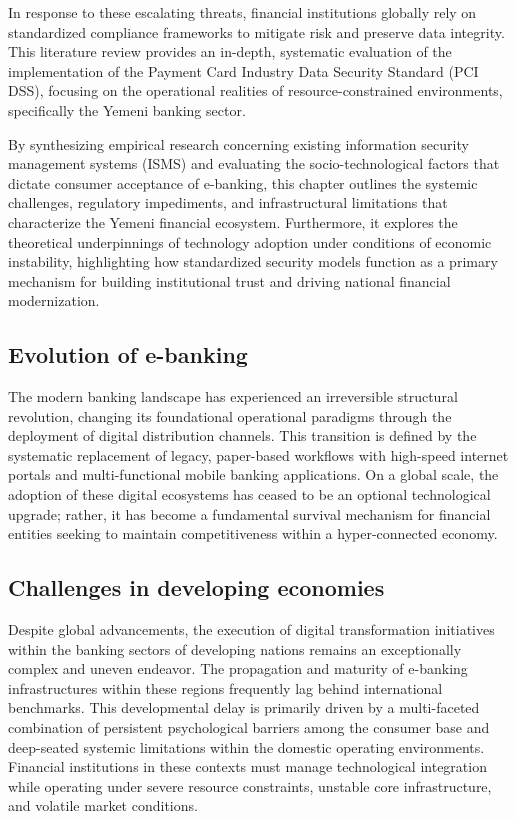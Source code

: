 \documentclass[12pt,a4paper,oneside]{report}
\begin{document}
	In response to these escalating threats, financial institutions globally rely on standardized compliance frameworks to mitigate risk and preserve data integrity. This literature review provides an in-depth, systematic evaluation of the implementation of the Payment Card Industry Data Security Standard (PCI DSS), focusing on the operational realities of resource-constrained environments, specifically the Yemeni banking sector. 
	
	By synthesizing empirical research concerning existing information security management systems (ISMS) and evaluating the socio-technological factors that dictate consumer acceptance of e-banking, this chapter outlines the systemic challenges, regulatory impediments, and infrastructural limitations that characterize the Yemeni financial ecosystem. Furthermore, it explores the theoretical underpinnings of technology adoption under conditions of economic instability, highlighting how standardized security models function as a primary mechanism for building institutional trust and driving national financial modernization.
	
	
	\subsection{Evolution of e-banking}
	The modern banking landscape has experienced an irreversible structural revolution, changing its foundational operational paradigms through the deployment of digital distribution channels. This transition is defined by the systematic replacement of legacy, paper-based workflows with high-speed internet portals and multi-functional mobile banking applications. On a global scale, the adoption of these digital ecosystems has ceased to be an optional technological upgrade; rather, it has become a fundamental survival mechanism for financial entities seeking to maintain competitiveness within a hyper-connected economy.
	
	\subsection{Challenges in developing economies}
	Despite global advancements, the execution of digital transformation initiatives within the banking sectors of developing nations remains an exceptionally complex and uneven endeavor. The propagation and maturity of e-banking infrastructures within these regions frequently lag behind international benchmarks. This developmental delay is primarily driven by a multi-faceted combination of persistent psychological barriers among the consumer base and deep-seated systemic limitations within the domestic operating environments. Financial institutions in these contexts must manage technological integration while operating under severe resource constraints, unstable core infrastructure, and volatile market conditions.
	
\end{document}
